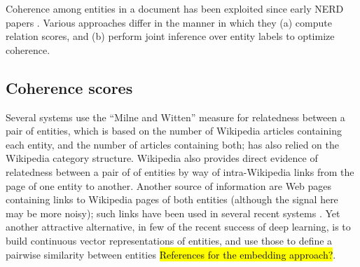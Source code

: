 Coherence among entities in a document has been exploited since early NERD papers \cite{Cucerzan07,Milne2008}.  
Various approaches differ in the manner in which they (a) compute relation scores, and (b) perform joint inference over entity labels to optimize coherence. 

\subsection{Coherence scores}

Several systems \cite{Milne2008,KulkarniSRC09,Hoffart2011} use the ``Milne and Witten'' measure for relatedness between a pair of entities, which is based on the number of Wikipedia articles containing each entity, and the number of articles containing both; \cite{Cucerzan07} has also relied on the Wikipedia category structure. %
Wikipedia also provides direct evidence of relatedness between a pair of of entities by way of intra-Wikipedia links from the page of one entity to another. Another source of information are Web pages containing links to Wikipedia pages of both entities (although the signal here may be more noisy); such links have been used in several recent systems \cite{ChengR13,Chisholm2015}.  Yet another attractive alternative, in few of the recent success of deep learning, is to build continuous vector representations of entities, and use those to define a pairwise similarity between entities \hl{References for the embedding approach?}.





